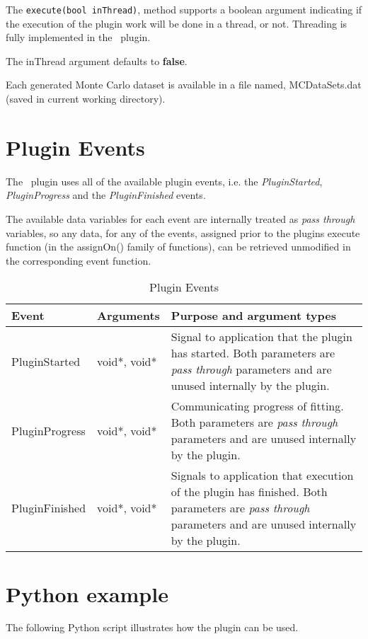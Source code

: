 The \verb|execute(bool inThread)|, method supports a boolean argument indicating if the execution of the plugin work will be done in a thread, or not. Threading is fully implemented in the \pname\ plugin.

The inThread argument defaults to \textbf{false}.

Each generated Monte Carlo dataset is available in a file named, MCDataSets.dat (saved in current working directory).


\section{Plugin Events}
The \pname\ plugin uses all of the available plugin events, i.e. the \emph{PluginStarted}, \emph{PluginProgress} and the \emph{PluginFinished} events.

The available data variables for each event are internally treated as \emph{pass through} variables, so any data, for any of the events, assigned prior to
the plugins execute function (in the assignOn() family of functions), can be retrieved unmodified in the corresponding event function.

\begin{table}[ht]
\centering %
\begin{tabular}{l l p{9cm}}

Event & Arguments & Purpose and argument types \\ [0.5ex] %
\hline %
PluginStarted  	& 	void*, void*  & Signal to application that the plugin has started. Both parameters are \emph{pass through} parameters and are unused internally by the plugin.\\[0.5ex]
PluginProgress	& 	void*, void*  & Communicating progress of fitting. Both parameters are \emph{pass through} parameters and are unused internally by the plugin. \\[0.5ex]
PluginFinished	& 	void*, void*  & Signals to application that execution of the plugin has finished. Both parameters are \emph{pass through} parameters and are unused internally by the plugin.\\

\hline %
\end{tabular}
\caption{Plugin Events}
\label{table:MCPluginEvents}
\end{table}

\section{Python example}
The following Python script illustrates how the plugin can be used.


